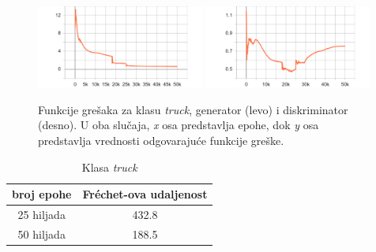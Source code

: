 \documentclass[12pt,oneside]{memoir}
\begin{document}
\begin{figure}[!htbp]
\centering
  \includegraphics[width=0.49\textwidth]{matfmaster/stylegan/truck/g_loss.png}
  \includegraphics[width=0.49\textwidth]{matfmaster/stylegan/truck/d_loss.png}
\caption{Funkcije grešaka za klasu \textit{truck}, generator (levo) i diskriminator (desno). U oba slučaja, \textit{x} osa predstavlja epohe, dok \textit{y} osa predstavlja vrednosti odgovarajuće funkcije greške.}\label{fig:section4_stylegan_truck_loss}
\end{figure}



\begin{table}[!htb]
\caption{Klasa \textit{truck}}\label{tab:section4_fid_t}
\centering
    \begin{tabular}{c|c}
        broj epohe &  Fréchet-ova udaljenost \\
        \hline
        25 hiljada & 432.8 \\
        \hline
        50 hiljada & 188.5 \\
    \end{tabular}
\end{table}
\end{document}
